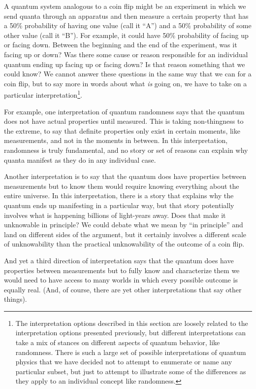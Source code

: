 \documentclass[onecolumn,preprintnumbers,amsmath,amssymbn,reprint,nofootinbib,superscriptaddress]{revtex4}    %
\begin{document}
A quantum system analogous to a coin flip might be an experiment in which we send quanta through an apparatus and then measure a certain property that has a 50\% probability of having one value (call it ``A'') and a 50\% probability of some other value (call it ``B''). For example, it could have 50\% probability of facing up or facing down.  Between the beginning and the end of the experiment, was it facing up or down?  Was there some cause or reason responsible for an individual quantum ending up facing up or facing down?  Is that reason something that we could know?  We cannot answer these questions in the same way that we can for a coin flip, but to say more in words about what {\em is} going on, we have to take on a particular interpretation\footnote{The interpretation options described in this section are loosely related to the interpretation options presented previously, but different interpretations can take a mix of stances on different aspects of quantum behavior, like randomness.  There is such a large set of possible interpretations of quantum physics that we have decided not to attempt to enumerate or name any particular subset, but just to attempt to illustrate some of the differences as they apply to an individual concept like randomness.}.

For example, one interpretation of quantum randomness says that the quantum does not have actual properties until measured.  This is taking non-thingness to the extreme, to say that definite properties only exist in certain moments, like measurements, and not in the moments in between.  In this interpretation, randomness is truly fundamental, and no story or set of reasons can explain why quanta manifest as they do in any individual case.

Another interpretation is to say that the quantum does have properties between measurements but to know them would require knowing everything about the entire universe.  In this interpretation, there is a story that explains why the quantum ends up manifesting in a particular way, but that story potentially involves what is happening billions of light-years away.  Does that make it unknowable in principle?  We could debate what we mean by ``in principle'' and land on different sides of the argument,  but it certainly involves a different scale of unknowability than the practical unknowability of the outcome of a coin flip.  

And yet a third direction of interpretation says that the quantum does have properties between measurements but to fully know and characterize them we would need to have access to many worlds in which every possible outcome is equally real.   (And, of course, there are yet other interpretations that say other things).  
\end{document}
